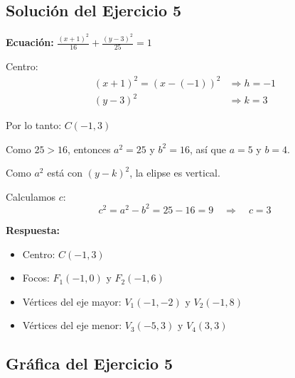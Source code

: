 \documentclass[12pt,a4paper]{article}
\begin{document}
	\subsection*{Solución del Ejercicio 5}

	\textbf{Ecuación:} $\displaystyle\frac{(x+1)^2}{16}+\frac{(y-3)^2}{25}=1$

	\bigskip

	Centro:
	\[
	\begin{aligned}
		(x+1)^2=(x-(-1))^2&\Rightarrow h=-1\\
		(y-3)^2&\Rightarrow k=3
	\end{aligned}
	\]

	Por lo tanto: $\boxed{C(-1,3)}$

	\bigskip

	Como $25>16$, entonces $a^2=25$ y $b^2=16$, así que $a=5$ y $b=4$.

	\bigskip

	Como $a^2$ está con $(y-k)^2$, la elipse es vertical.

	\bigskip

	Calculamos $c$:
	\[
	c^2=a^2-b^2=25-16=9 \quad\Rightarrow\quad c=3
	\]

	\textbf{Respuesta:}
	\begin{itemize}
		\item Centro: $\boxed{C(-1,3)}$
		\item Focos: $\boxed{F_1(-1,0)\text{ y }F_2(-1,6)}$
		\item Vértices del eje mayor: $\boxed{V_1(-1,-2)\text{ y }V_2(-1,8)}$
		\item Vértices del eje menor: $\boxed{V_3(-5,3)\text{ y }V_4(3,3)}$
	\end{itemize}

	\subsection*{Gráfica del Ejercicio 5}
\end{document}
